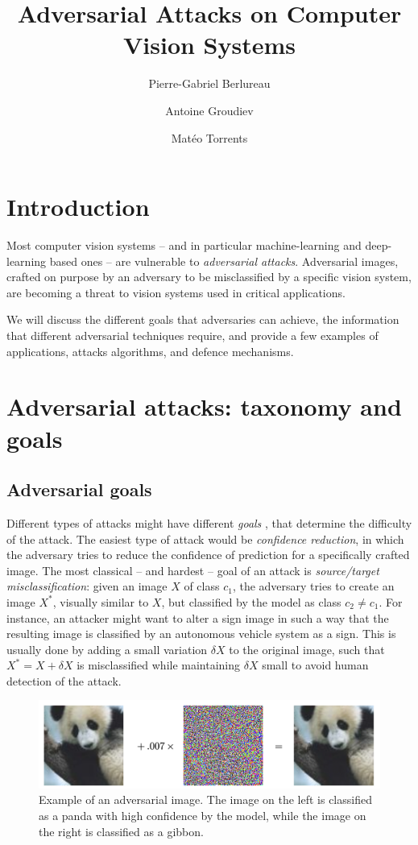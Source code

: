 \documentclass[twocolumn]{../cs-classes/cs-classes}
\title{Adversarial Attacks on Computer Vision Systems}
\author{Pierre-Gabriel Berlureau\and Antoine Groudiev\and Matéo Torrents}
\date{}
\begin{document}
\maketitle
\section{Introduction}
Most computer vision systems -- and in particular machine-learning and deep-learning based ones -- are vulnerable to \emph{adversarial attacks}. Adversarial images, crafted on purpose by an adversary to be misclassified by a specific vision system, are becoming a threat to vision systems used in critical applications.

We will discuss the different goals that adversaries can achieve, the information that different adversarial techniques require, and provide a few examples of applications, attacks algorithms, and defence mechanisms.

\section{Adversarial attacks: taxonomy and goals}
%
\subsection{Adversarial goals}
Different types of attacks might have different \emph{goals} \cite{chakraborty2021survey}, that determine the difficulty of the attack. The easiest type of attack would be \emph{confidence reduction}, in which the adversary tries to reduce the
confidence of prediction for a specifically crafted image. The most classical -- and hardest -- goal of an attack is \emph{source/target misclassification}: given an image $X$ of class $c_1$, the adversary tries to create an image $X^*$, visually similar to $X$, but classified by the model as class $c_2\neq c_1$. For instance, an attacker might want to alter a  sign image in such a way that the resulting image is classified by an autonomous vehicle system as a  sign. This is usually done by adding a small variation $\delta X$ to the original image, such that $X^*=X+\delta X$ is misclassified while maintaining $\delta X$ small to avoid human detection of the attack.

\begin{figure}[H]
    \centering
    \includegraphics[width=\linewidth]{panda.png}
    \caption{Example of an adversarial image.\cite{goodfellow2014explaining} The image on the left is classified as a panda with high confidence by the model, while the image on the right is classified as a gibbon.}
\end{figure}
\end{document}
